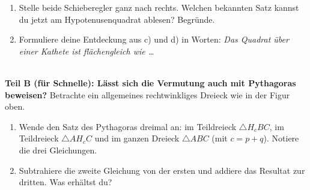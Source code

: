 \documentclass[11pt,oneside]{article}
\begin{document}
\begin{aufgabe}
\begin{enumerate}[label=\alph*), resume]
	\end{enumerate}
	\begin{enumerate}[label=\alph*), resume]
		\item Stelle beide Schieberegler ganz nach rechts. Welchen bekannten Satz kannst du jetzt am Hypotenusenquadrat ablesen? Begründe.
		\item Formuliere deine Entdeckung aus c) und d) in Worten: \textit{Das Quadrat über einer Kathete ist flächengleich wie \ldots}
	\end{enumerate}
	\\[3mm]
	\textbf{Teil B (für Schnelle): Lässt sich die Vermutung auch mit Pythagoras beweisen?} Betrachte ein allgemeines rechtwinkliges Dreieck wie in der Figur oben.
	\begin{enumerate}[label=\alph*), resume]
		\item Wende den Satz des Pythagoras dreimal an: im Teildreieck $\triangle H_cBC$, im Teildreieck $\triangle AH_cC$ und im ganzen Dreieck $\triangle ABC$ (mit $c=p+q$). Notiere die drei Gleichungen.
		\item Subtrahiere die zweite Gleichung von der ersten und addiere das Resultat zur dritten. Was erhältst du?
	\end{enumerate}
\end{aufgabe}

\newpage
\end{document}

